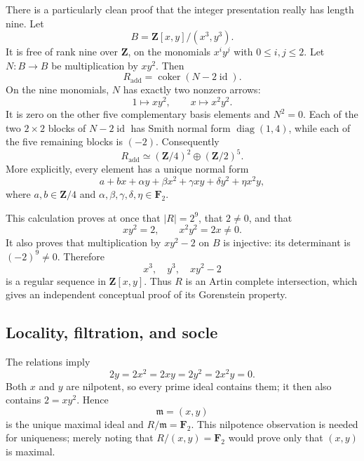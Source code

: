 \documentclass[11pt]{article}
\theoremstyle{remark}
\newcommand{\Z}{\mathbf Z}
\newcommand{\F}{\mathbf F}
\newcommand{\m}{\mathfrak m}
\newcommand{\id}{\operatorname{id}}
\begin{document}
There is a particularly clean proof that the integer presentation really has
length nine.  Let
\[
 B=\Z[x,y]/(x^3,y^3).
\]
It is free of rank nine over $\Z$, on the monomials $x^iy^j$ with
$0\le i,j\le2$.  Let $N:B\to B$ be multiplication by $xy^2$.  Then
\[
 R_{\mathrm{add}}=\operatorname{coker}(N-2\id).
\]
On the nine monomials, $N$ has exactly two nonzero arrows:
\[
 1\longmapsto xy^2,
 \qquad x\longmapsto x^2y^2.
\]
It is zero on the other five complementary basis elements and $N^2=0$.
Each of the two $2\times2$ blocks of $N-2\id$ has Smith normal form
$\operatorname{diag}(1,4)$, while each of the five remaining blocks is
$(-2)$.  Consequently
\begin{equation}\label{eq:additive-R}
 R_{\mathrm{add}}\simeq(\Z/4)^2\oplus(\Z/2)^5.
\end{equation}
More explicitly, every element has a unique normal form
\begin{equation}\label{eq:normal-form-R}
 a+bx+\alpha y+\beta x^2+\gamma xy+\delta y^2+\eta x^2y,
\end{equation}
where $a,b\in\Z/4$ and
$\alpha,\beta,\gamma,\delta,\eta\in\F_2$.

This calculation proves at once that $|R|=2^9$, that $2\ne0$, and that
\begin{equation}\label{eq:carry}
 xy^2=2,
 \qquad x^2y^2=2x\ne0.
\end{equation}
It also proves that multiplication by $xy^2-2$ on $B$ is injective: its
determinant is $(-2)^9\ne0$.  Therefore
\[
 x^3,\quad y^3,\quad xy^2-2
\]
is a regular sequence in $\Z[x,y]$.  Thus $R$ is an Artin complete
intersection, which gives an independent conceptual proof of its
Gorenstein property.

\subsection{Locality, filtration, and socle}

The relations imply
\begin{equation}\label{eq:torsion}
 2y=2x^2=2xy=2y^2=2x^2y=0.
\end{equation}
Both $x$ and $y$ are nilpotent, so every prime ideal contains them; it then
also contains $2=xy^2$.  Hence
\[
 \m=(x,y)
\]
is the unique maximal ideal and $R/\m=\F_2$.  This nilpotence observation is
needed for uniqueness; merely noting that $R/(x,y)=\F_2$ would prove only
that $(x,y)$ is maximal.
\end{document}
